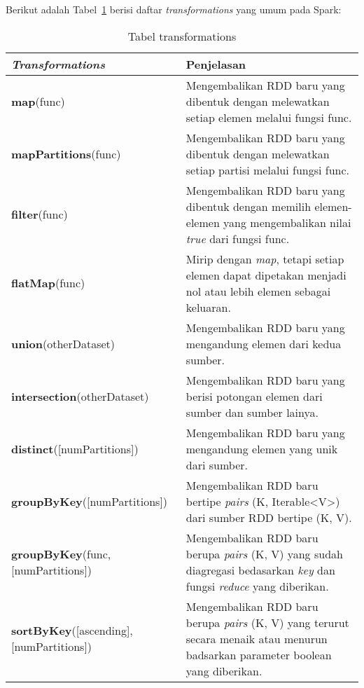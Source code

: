 Berikut adalah Tabel~\ref{tab:trans} berisi daftar \textit{transformations} yang umum pada Spark:

\begin{table}[H] 
	\centering 
	\caption{Tabel transformations}
	\label{tab:trans}
	\begin{tabular}{p{6cm}p{9cm}}
		\toprule[1.5pt]
\hline
		 \textbf{\textit{Transformations}} & Penjelasan \\
\hline
\midrule

\hline
\textbf{map}(func) & Mengembalikan RDD baru yang dibentuk dengan melewatkan setiap elemen melalui fungsi func. \\
\hline

\textbf{mapPartitions}(func) & Mengembalikan RDD baru yang dibentuk dengan melewatkan setiap partisi melalui fungsi func.\\

\hline

\textbf{filter}(func) & Mengembalikan RDD baru yang dibentuk dengan memilih elemen-elemen yang mengembalikan nilai \textit{true} dari fungsi func. \\
\hline

\textbf{flatMap}(func) & Mirip dengan \textit{map}, tetapi setiap elemen dapat dipetakan menjadi nol atau lebih elemen sebagai keluaran. \\
\hline


\textbf{union}(otherDataset) & Mengembalikan RDD baru yang mengandung elemen dari kedua sumber.\\

\hline
\textbf{intersection}(otherDataset) & Mengembalikan RDD baru yang berisi potongan elemen dari sumber dan sumber lainya.\\ 

\hline
\textbf{distinct}([numPartitions]) & Mengembalikan RDD baru yang mengandung elemen yang unik dari sumber.\\

\hline
\textbf{groupByKey}([numPartitions]) & Mengembalikan RDD baru bertipe \textit{pairs}  (K, Iterable<V>) dari sumber RDD bertipe (K, V).\\


\hline
\textbf{groupByKey}(func,[numPartitions]) & Mengembalikan RDD baru berupa \textit{pairs} (K, V) yang sudah diagregasi bedasarkan \textit{key} dan fungsi \textit{reduce} yang diberikan.\\

\hline
\textbf{sortByKey}([ascending], [numPartitions]) & Mengembalikan RDD baru berupa \textit{pairs}  (K, V) yang terurut secara menaik atau menurun badsarkan parameter boolean yang diberikan.\\


\end{tabular}
\end{table}
